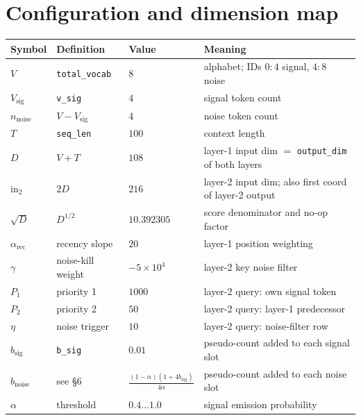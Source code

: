 \documentclass[11pt]{article}
\newcommand{\sd}{\sqrt{D}}
\begin{document}
\section{Configuration and dimension map}

\begin{center}
\begin{tabular}{@{}llll@{}}
\toprule
\textbf{Symbol} & \textbf{Definition} & \textbf{Value} & \textbf{Meaning}\\
\midrule
$V$        & \texttt{total\_vocab}  & $8$ & alphabet; IDs $0{:}4$ signal, $4{:}8$ noise\\
$V_{\mathrm{sig}}$ & \texttt{v\_sig} & $4$ & signal token count\\
$n_{\mathrm{noise}}$ & $V-V_{\mathrm{sig}}$ & $4$ & noise token count\\
$T$        & \texttt{seq\_len}      & $100$ & context length\\
$D$        & $V+T$                  & $108$ & layer-1 input dim $=$ \texttt{output\_dim} of both layers\\
$\mathrm{in}_2$ & $2D$              & $216$ & layer-2 input dim; also first coord of layer-2 output\\
$\sd$      & $D^{1/2}$              & $10.392305$ & score denominator and no-op factor\\
$\alpha_{\mathrm{rec}}$ & recency slope & $20$ & layer-1 position weighting\\
$\gamma$   & noise-kill weight      & $-5\times10^4$ & layer-2 key noise filter\\
$P_1$      & priority 1             & $1000$ & layer-2 query: own signal token\\
$P_2$      & priority 2             & $50$ & layer-2 query: layer-1 predecessor\\
$\eta$     & noise trigger          & $10$ & layer-2 query: noise-filter row\\
$b_{\mathrm{sig}}$ & \texttt{b\_sig} & $0.01$ & pseudo-count added to each signal slot\\
$b_{\mathrm{noise}}$ & see \S6 & $\tfrac{(1-\alpha)(1+4b_{\mathrm{sig}})}{4\alpha}$ & pseudo-count added to each noise slot\\
$\alpha$   & threshold              & $0.4\ldots1.0$ & signal emission probability\\
\bottomrule
\end{tabular}
\end{center}
\end{document}
